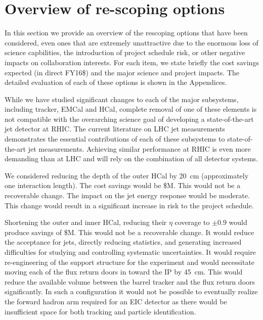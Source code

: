 
\section{Overview of re-scoping options}
\label{sec:overview-re-scoping}

In this section we provide an overview of the rescoping options that
have been considered, even ones that are extremely unattractive due to
the enormous loss of science capbilities, the introduction of project
schedule risk, or other negative impacts on collaboration interests.
For each item, we state briefly the cost savings expected (in direct
FY16\$) and the major science and project impacts.  The detailed
evaluation of each of these options is shown in the Appendices.

While we have studied significant changes to each of the major subsystems,
including tracker, EMCal and HCal, complete removal of one of 
these elements is not compatible with the overarching science goal
of developing a state-of-the-art jet detector at RHIC. The current 
literature on LHC jet measurements demonstrates the essential 
contributions of each of these subsystems to state-of-the-art jet 
measurements. Achieving similar performance at RHIC is 
even more demanding than at LHC and will rely on the combination 
of all detector systems.

We considered reducing the depth of the outer HCal by 20~cm
(approximately one interaction length).  The cost savings would be
\${\thinnedOuterHCal}M.  This would not be a recoverable change. The
impact on the jet energy response would be moderate.  This change
would result in a significant increase in risk to the project
schedule.

Shortening the outer and inner HCal, reducing their $\eta$ coverage to
$\pm0.9$ would produce savings of \${\shortenedHCal}M.  This would not be a
recoverable change.  It would reduce the acceptance for jets, directly
reducing statistics, and generating increased difficulties for
studying and controlling systematic uncertainties.  It would require
re-engineering of the support structure for the experiment and would
necessitate moving each of the flux return doors in toward the IP by
45~cm.  This would reduce the available volume between the barrel tracker 
and the flux return doors significantly. In such a configuration it 
would not be possible to eventually realize the forward hadron arm 
required for an EIC detector as there would be insufficient space for 
both tracking and particle identification.

